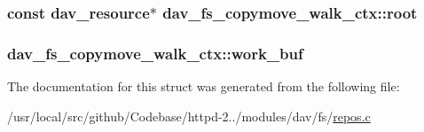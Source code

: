 \subsubsection[{\texorpdfstring{root}{root}}]{\setlength{\rightskip}{0pt plus 5cm}const {\bf dav\+\_\+resource}$\ast$ dav\+\_\+fs\+\_\+copymove\+\_\+walk\+\_\+ctx\+::root}\hypertarget{structdav__fs__copymove__walk__ctx_a0442f9d03a1cf4ba98ff93d37a3af024}{}\label{structdav__fs__copymove__walk__ctx_a0442f9d03a1cf4ba98ff93d37a3af024}
\subsubsection[{\texorpdfstring{work\+\_\+buf}{work_buf}}]{ dav\+\_\+fs\+\_\+copymove\+\_\+walk\+\_\+ctx\+::work\+\_\+buf}\hypertarget{structdav__fs__copymove__walk__ctx_a4d23d1bad977b122ab0e40ce6f3fe727}{}\label{structdav__fs__copymove__walk__ctx_a4d23d1bad977b122ab0e40ce6f3fe727}


The documentation for this struct was generated from the following file\+:\begin{DoxyCompactItemize}
\item 
/usr/local/src/github/\+Codebase/httpd-\/2../modules/dav/fs/\hyperlink{repos_8c}{repos.\+c}\end{DoxyCompactItemize}
